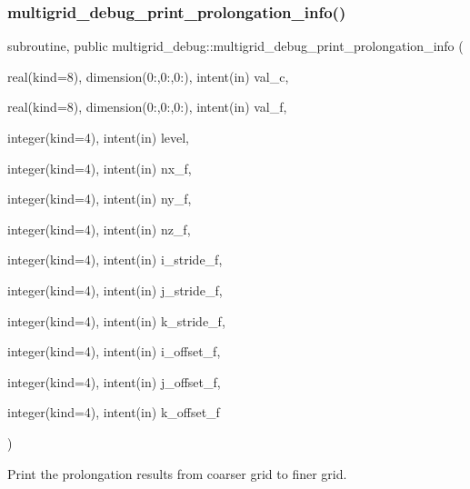 \subsubsection{\texorpdfstring{multigrid\+\_\+debug\+\_\+print\+\_\+prolongation\+\_\+info()}{multigrid\_debug\_print\_prolongation\_info()}}
{\footnotesize\ttfamily subroutine, public multigrid\+\_\+debug\+::multigrid\+\_\+debug\+\_\+print\+\_\+prolongation\+\_\+info (\begin{DoxyParamCaption}\item[{real(kind=8), dimension(0\+:,0\+:,0\+:), intent(in)}]{val\+\_\+c,  }\item[{real(kind=8), dimension(0\+:,0\+:,0\+:), intent(in)}]{val\+\_\+f,  }\item[{integer(kind=4), intent(in)}]{level,  }\item[{integer(kind=4), intent(in)}]{nx\+\_\+f,  }\item[{integer(kind=4), intent(in)}]{ny\+\_\+f,  }\item[{integer(kind=4), intent(in)}]{nz\+\_\+f,  }\item[{integer(kind=4), intent(in)}]{i\+\_\+stride\+\_\+f,  }\item[{integer(kind=4), intent(in)}]{j\+\_\+stride\+\_\+f,  }\item[{integer(kind=4), intent(in)}]{k\+\_\+stride\+\_\+f,  }\item[{integer(kind=4), intent(in)}]{i\+\_\+offset\+\_\+f,  }\item[{integer(kind=4), intent(in)}]{j\+\_\+offset\+\_\+f,  }\item[{integer(kind=4), intent(in)}]{k\+\_\+offset\+\_\+f }\end{DoxyParamCaption})}



Print the prolongation results from coarser grid to finer grid. 


